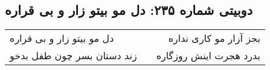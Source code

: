 \begin{center}
\section*{دوبیتی شماره ۲۳۵: دل مو بیتو زار و بی قراره}
\label{sec:235}
\begin{longtable}{l p{0.5cm} r}
دل مو بیتو زار و بی قراره
&&
بجز آزار مو کاری نداره
\\
زند دستان بسر چون طفل بدخو
&&
بدرد هجرت اینش روزگاره
\\
\end{longtable}
\end{center}
